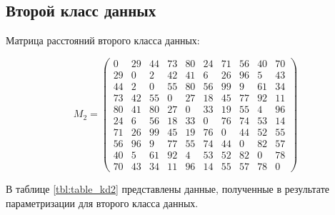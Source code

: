 \documentclass[a4paper,14pt, unknownkeysallowed]{extreport}
\begin{document}
\begin{center}
\begin{longtable}[c]{|c|c|c|c|c|c|}
\end{longtable}
\end{center}

\subsection{Второй класс данных}

Матрица расстояний второго класса данных:

\begin{equation}
    \label{eq:kd1}
	M_{2} = \begin{pmatrix}
    0 & 29 & 44 & 73 & 80 & 24 & 71 & 56 & 40 & 70 \\ 
    29 & 0 & 2 & 42 & 41 & 6 & 26 & 96 & 5 & 43 \\ 
    44 & 2 & 0 & 55 & 80 & 56 & 99 & 9 & 61 & 34 \\ 
    73 & 42 & 55 & 0 & 27 & 18 & 45 & 77 & 92 & 11 \\ 
    80 & 41 & 80 & 27 & 0 & 33 & 19 & 55 & 4 & 96 \\ 
    24 & 6 & 56 & 18 & 33 & 0 & 76 & 74 & 53 & 14 \\ 
    71 & 26 & 99 & 45 & 19 & 76 & 0 & 44 & 52 & 55 \\ 
    56 & 96 & 9 & 77 & 55 & 74 & 44 & 0 & 82 & 57 \\ 
    40 & 5 & 61 & 92 & 4 & 53 & 52 & 82 & 0 & 78 \\ 
    70 & 43 & 34 & 11 & 96 & 14 & 55 & 57 & 78 & 0  
	\end{pmatrix}
\end{equation}

В таблице \ref{tbl:table_kd2} представлены данные, полученные в результате параметризации для второго класса данных.
\end{document}
